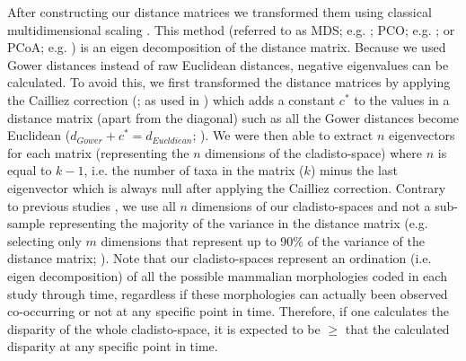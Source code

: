 \documentclass[12pt,letterpaper]{article}
\renewcommand{\subsubsection}[1]{%
\vspace{2ex}
\noindent
\textit{#1.}---}
\begin{document}
After constructing our distance matrices we transformed them using classical multidimensional scaling \citep[MDS;][]{torgerson1965multidimensional,GOWER01121966,cailliez1983analytical}.
This method (referred to as MDS; e.g. \citealt{DonohueDim}; PCO; e.g. \citealt{Brusatte2015}; or PCoA; e.g. \citealt{paradisape:2004}) is an eigen decomposition of the distance matrix.
Because we used Gower distances instead of raw Euclidean distances, negative eigenvalues can be calculated.
To avoid this, we first transformed the distance matrices by applying the Cailliez correction (\citealt{cailliez1983analytical}; as used in \citealt{toljagictriassic-jurassic2013}) which adds a constant $c^*$ to the values in a distance matrix (apart from the diagonal) such as all the Gower distances become Euclidean ($d_{Gower}+c^*=d_{Eucldiean}$; \citealt{cailliez1983analytical}). 
We were then able to extract $n$ eigenvectors for each matrix (representing the $n$ dimensions of the cladisto-space) where $n$ is equal to $k-1$, i.e. the number of taxa in the matrix ($k$) minus the last eigenvector which is always null after applying the Cailliez correction.
Contrary to previous studies \citep[e.g][]{brusatte50,cisneros2010,prentice2011,anderson2012using,Hughes20082013,bentonmodels2014}, we use all $n$ dimensions of our cladisto-spaces and not a sub-sample representing the majority of the variance in the distance matrix (e.g. selecting only $m$ dimensions that represent up to 90\% of the variance of the distance matrix; \citealt{Brusatte12092008,toljagictriassic-jurassic2013}).
Note that our cladisto-spaces represent an ordination (i.e. eigen decomposition) of all the possible mammalian morphologies coded in each study through time, regardless if these morphologies can actually been observed co-occurring or not at any specific point in time.
Therefore, if one calculates the disparity of the whole cladisto-space, it is expected to be $\geq$ that the calculated disparity at any specific point in time.
\end{document}
